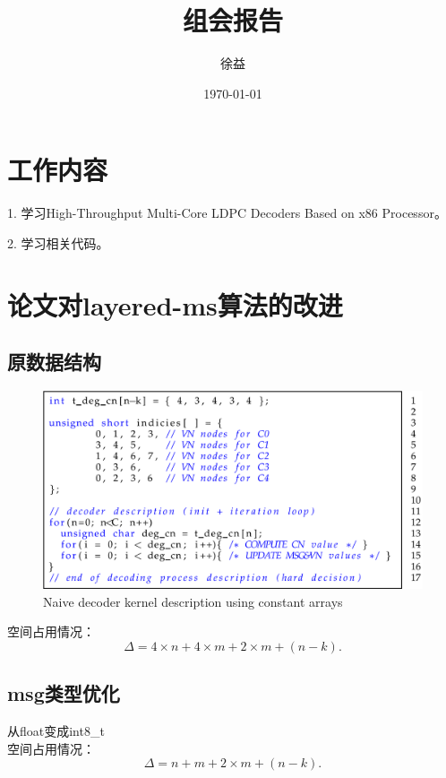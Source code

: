 \documentclass{article}
\title{组会报告}
\author{徐益}
\date{\today}
\begin{document}
\maketitle


\section{工作内容}
1. 学习High-Throughput Multi-Core LDPC Decoders Based on x86 Processor。

2. 学习相关代码。

\section{论文对layered-ms算法的改进}
\subsection{原数据结构}
\begin{figure}[H]
	\centering
	\includegraphics[width = .8\textwidth]{kernel.png}
	\caption{Naive decoder kernel description using constant arrays}
\end{figure}
空间占用情况：
\begin{equation}
	\Delta = 4 \times n + 4 \times m + 2 \times m + (n-k).
\end{equation}
\subsection{msg类型优化}
从float变成int8\_t\\
空间占用情况：
\begin{equation}
	\Delta = n + m + 2 \times m + (n-k).
\end{equation}
\end{document}
